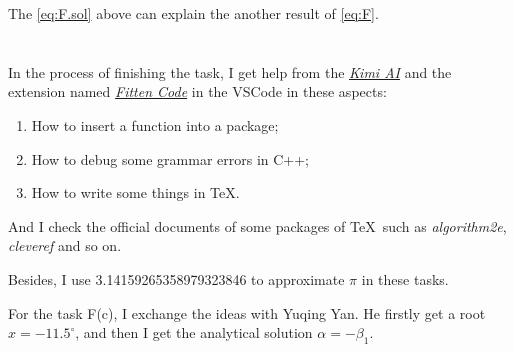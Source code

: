 \documentclass[a4paper]{article}
\begin{document}
The \cref{eq:F.sol} above can explain the another result of \cref{eq:F}.

\section*{  }
In the process of finishing the task, I get help from the \href{https://kimi.moonshot.cn}{\textit{Kimi AI}} and the extension named \href{https://code.fittentech.com/tutor_vscode_en}{\textit{Fitten Code}} in the VSCode in these aspects:
\begin{enumerate}
  \item How to insert a function into a package;
  \item How to debug some grammar errors in C++;
  \item How to write some things in \TeX. 
\end{enumerate}

And I check the official documents of some packages of \TeX \ such as \textit{algorithm2e}, \textit{cleveref} and so on.

Besides, I use 3.14159265358979323846 to approximate $\pi$ in these tasks.

For the task F(c), I exchange the ideas with Yuqing Yan. He firstly get a root $x = -11.5^{\circ}$, and then I get the analytical solution $\alpha = -\beta_1$.

\printbibliography
\end{document}
